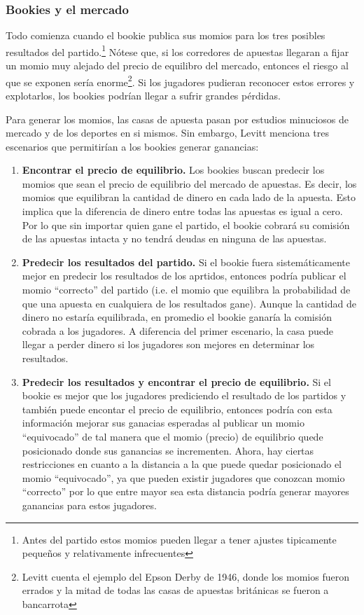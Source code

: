 \subsubsection{Bookies y el mercado}
Todo comienza cuando el bookie publica sus momios para los tres posibles resultados del partido.\footnote{Antes del partido estos momios pueden llegar a tener ajustes tipicamente pequeños y relativamente infrecuentes} Nótese que, si los corredores de apuestas llegaran a fijar un momio muy alejado del precio de equilibro del mercado, entonces el riesgo al que se exponen sería enorme\footnote{Levitt \cite{levitt2004gambling} cuenta el ejemplo del Epson Derby de 1946, donde los momios fueron errados y la mitad de todas las casas de apuestas británicas se fueron a bancarrota}. Si los jugadores pudieran reconocer estos errores y explotarlos, los bookies podrían llegar a sufrir grandes pérdidas.

Para generar los momios, las casas de apuesta pasan por estudios minuciosos de mercado y de los deportes en si mismos. Sin embargo, Levitt \cite{levitt2004gambling} menciona tres escenarios que permitirían a los bookies generar ganancias:
\begin{enumerate}
	\item \textbf{Encontrar el precio de equilibrio.} Los bookies buscan predecir los momios que sean el precio de equilibrio del mercado de apuestas. Es decir, los momios que equilibran la cantidad de dinero en cada lado de la apuesta. Esto implica que la diferencia de dinero entre todas las apuestas es igual a cero. Por lo que sin importar quien gane el partido, el bookie cobrará su comisión de las apuestas intacta y no tendrá deudas en ninguna de las apuestas.
	\item \textbf{Predecir los resultados del partido.} Si el bookie fuera sistemáticamente mejor en predecir los resultados de los aprtidos, entonces podría publicar el momio ``correcto'' del partido (i.e. el momio que equilibra la probabilidad de que una apuesta en cualquiera de los resultados gane). Aunque la cantidad de dinero no estaría equilibrada, en promedio el bookie ganaría la comisión cobrada a los jugadores. A diferencia del primer escenario, la casa puede llegar a perder dinero si los jugadores son mejores en determinar los resultados.
	\item \textbf{Predecir los resultados y encontrar el precio de equilibrio.} Si el bookie es mejor que los jugadores prediciendo el resultado de los partidos y también puede encontar el precio de equilibrio, entonces podría con esta información mejorar sus ganacias esperadas al publicar un momio ``equivocado'' de tal manera que el momio (precio) de equilibrio quede posicionado donde sus ganancias se incrementen. Ahora, hay ciertas restricciones en cuanto a la distancia a la que puede quedar posicionado el momio ``equivocado'', ya que pueden existir jugadores que conozcan momio ``correcto'' por lo que entre mayor sea esta distancia podría generar mayores ganancias para estos jugadores.
\end{enumerate}

